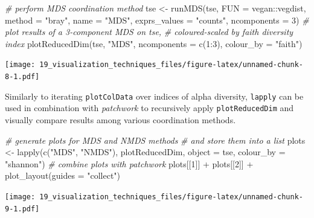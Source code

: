 \documentclass[
]{book}
\newenvironment{Shaded}{\begin{snugshade}}{\end{snugshade}}
\newcommand{\AttributeTok}[1]{\textcolor[rgb]{0.77,0.63,0.00}{#1}}
\newcommand{\CommentTok}[1]{\textcolor[rgb]{0.56,0.35,0.01}{\textit{#1}}}
\newcommand{\DecValTok}[1]{\textcolor[rgb]{0.00,0.00,0.81}{#1}}
\newcommand{\FunctionTok}[1]{\textcolor[rgb]{0.00,0.00,0.00}{#1}}
\newcommand{\NormalTok}[1]{#1}
\newcommand{\OtherTok}[1]{\textcolor[rgb]{0.56,0.35,0.01}{#1}}
\newcommand{\SpecialCharTok}[1]{\textcolor[rgb]{0.00,0.00,0.00}{#1}}
\newcommand{\StringTok}[1]{\textcolor[rgb]{0.31,0.60,0.02}{#1}}
\begin{document}
\begin{Shaded}
\begin{Highlighting}[]
\CommentTok{\# perform MDS coordination method}
\NormalTok{tse }\OtherTok{\textless{}{-}} \FunctionTok{runMDS}\NormalTok{(tse,}
              \AttributeTok{FUN =}\NormalTok{ vegan}\SpecialCharTok{::}\NormalTok{vegdist,}
              \AttributeTok{method =} \StringTok{"bray"}\NormalTok{,}
              \AttributeTok{name =} \StringTok{"MDS"}\NormalTok{,}
              \AttributeTok{exprs\_values =} \StringTok{"counts"}\NormalTok{,}
              \AttributeTok{ncomponents =} \DecValTok{3}\NormalTok{)}
\CommentTok{\# plot results of a 3{-}component MDS on tse,}
\CommentTok{\# coloured{-}scaled by faith diversity index}
\FunctionTok{plotReducedDim}\NormalTok{(tse, }\StringTok{"MDS"}\NormalTok{, }\AttributeTok{ncomponents =} \FunctionTok{c}\NormalTok{(}\DecValTok{1}\SpecialCharTok{:}\DecValTok{3}\NormalTok{), }\AttributeTok{colour\_by =} \StringTok{"faith"}\NormalTok{)}
\end{Highlighting}
\end{Shaded}

\texttt{[image: 19\_visualization\_techniques\_files/figure-latex/unnamed-chunk-8-1.pdf]}

Similarly to iterating \texttt{plotColData} over indices of alpha diversity,
\texttt{lapply} can be used in combination with \emph{patchwork} to recursively
apply \texttt{plotReducedDim} and visually compare results among various
coordination methods.

\begin{Shaded}
\begin{Highlighting}[]
\CommentTok{\# generate plots for MDS and NMDS methods}
\CommentTok{\# and store them into a list}
\NormalTok{plots }\OtherTok{\textless{}{-}} \FunctionTok{lapply}\NormalTok{(}\FunctionTok{c}\NormalTok{(}\StringTok{"MDS"}\NormalTok{, }\StringTok{"NMDS"}\NormalTok{),}
\NormalTok{                plotReducedDim,}
                \AttributeTok{object =}\NormalTok{ tse,}
                \AttributeTok{colour\_by =} \StringTok{"shannon"}\NormalTok{)}
\CommentTok{\# combine plots with patchwork}
\NormalTok{plots[[}\DecValTok{1}\NormalTok{]] }\SpecialCharTok{+}\NormalTok{ plots[[}\DecValTok{2}\NormalTok{]] }\SpecialCharTok{+}
  \FunctionTok{plot\_layout}\NormalTok{(}\AttributeTok{guides =} \StringTok{"collect"}\NormalTok{)}
\end{Highlighting}
\end{Shaded}

\texttt{[image: 19\_visualization\_techniques\_files/figure-latex/unnamed-chunk-9-1.pdf]}
\end{document}
